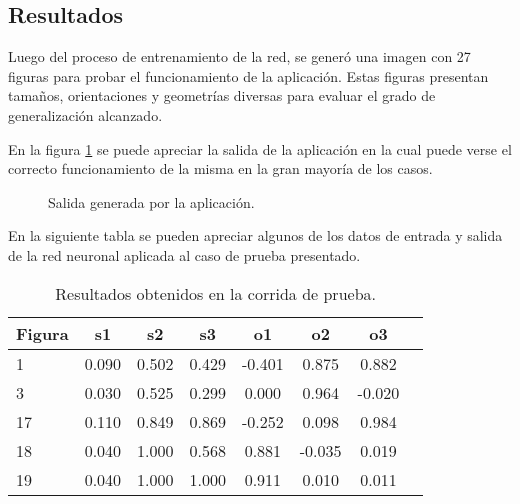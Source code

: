 \documentclass[pdftex,a4paper,10.5pt]{article}
\begin{document}
\subsection{Resultados} %

Luego del proceso de entrenamiento de la red, se gener\'o una imagen con 27 figuras para probar el funcionamiento de la aplicaci\'on. Estas figuras presentan tama\~nos, orientaciones y geometr\'ias diversas para evaluar el grado de generalizaci\'on alcanzado.

En la figura \ref{salida_ejemlpo} se puede apreciar la salida de la aplicaci\'on en la cual puede verse el correcto funcionamiento de la misma en la gran mayor\'ia de los casos.

 	           \begin{figure}[H]

	                  \begin{center}
	                    \caption{\label{salida_ejemlpo} Salida generada por la aplicaci\'on. }
	                  \end{center}
	            \end{figure}


En la siguiente tabla se pueden apreciar algunos de los datos de entrada y salida de la red neuronal aplicada al caso de prueba presentado.

\begin{table}[ht]
\centering
\begin{tabular}{|l|c|c|c|c|c|c|c|}
  \hline                       
  \textbf{Figura} & \textbf{s1} & \textbf{s2} & \textbf{s3} & \textbf{o1} & \textbf{o2} & \textbf{o3}\\
  \hline
1 & 0.090 & 0.502 & 0.429 & -0.401 & 0.875 & 0.882\\
\hline
3 & 0.030 & 0.525 & 0.299 & 0.000 & 0.964 & -0.020\\
\hline
17 & 0.110 & 0.849 & 0.869 & -0.252 & 0.098 & 0.984\\
\hline
18 & 0.040 & 1.000 & 0.568 & 0.881 & -0.035 & 0.019\\
\hline
19 & 0.040 & 1.000 & 1.000 & 0.911 & 0.010 & 0.011\\

\hline
\end{tabular}	 
\caption{Resultados obtenidos en la corrida de prueba.}
\end{table}
\end{document}
